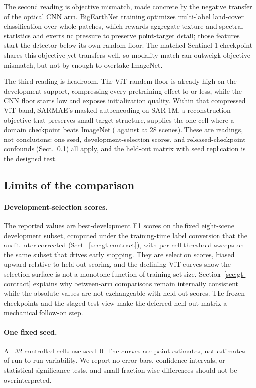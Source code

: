The second reading is objective mismatch, made concrete by the negative
transfer of the optical CNN arm. BigEarthNet training optimizes multi-label
land-cover classification over whole patches, which rewards aggregate
texture and spectral statistics and exerts no pressure to preserve
point-target detail; those features start the detector below its own random
floor. The matched Sentinel-1 checkpoint shares this objective yet
transfers well, so modality match can outweigh objective mismatch, but not
by enough to overtake ImageNet.

The third reading is headroom. The ViT random floor is already high on the
development support, compressing every pretraining effect to
\SarOptVitMaxAbs{} or less, while the CNN floor starts low and exposes
initialization quality. Within that compressed ViT band, SARMAE's masked
autoencoding on SAR-1M, a reconstruction objective that preserves
small-target structure, supplies the one cell where a domain checkpoint
beats ImageNet (\DevFVitSarTwentyFive{} against
\DevFVitImageNetTwentyFive{} at 28 scenes). These are readings, not
conclusions: one seed, development-selection scores, and released-checkpoint
confounds (Sect.~\ref{sec:limitations}) all apply, and the held-out matrix
with seed replication is the designed test.

\subsection{Limits of the comparison}
\label{sec:limitations}

\paragraph{Development-selection scores.}
The reported values are best-development F1 scores on the fixed eight-scene
development subset, computed under the training-time label conversion that
the audit later corrected (Sect.~\ref{sec:gt-contract}), with per-cell
threshold sweeps on the same subset that drives early stopping. They are
selection scores, biased upward relative to held-out scoring, and the
declining ViT curves show the selection surface is not a monotone function
of training-set size. Section~\ref{sec:gt-contract} explains why between-arm
comparisons remain internally consistent while the absolute values are not
exchangeable with held-out scores. The frozen checkpoints and the staged
test view make the deferred held-out matrix a mechanical follow-on step.

\paragraph{One fixed seed.}
All 32 controlled cells use seed~0. The curves are point estimates, not
estimates of run-to-run variability. We report no error bars, confidence
intervals, or statistical significance tests, and small fraction-wise
differences should not be overinterpreted.

